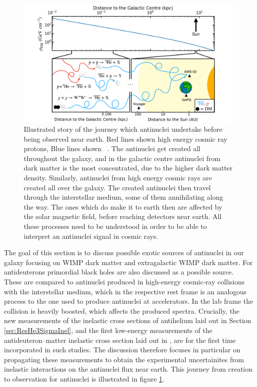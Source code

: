 \begin{figure}
    \centering
    \includegraphics[width=\textwidth]{figures/GalaxyStory.pdf}
    \caption{Illustrated story of the journey which antinuclei undertake before being observed near earth. Red lines shown high energy cosmic ray protons, Blue lines shown \ahe\ . The antinuclei get created all throughout the galaxy, and in the galactic centre antinuclei from dark matter is the most concentrated, due to the higher dark matter density. Similarly, antinuclei from high energy cosmic rays are created all over the galaxy. The created antinuclei then travel through the interstellar medium, some of them annihilating along the way. The ones which do make it to earth then are affected by the solar magnetic field, before reaching detectors near earth. All these processes need to be understood in order to be able to interpret an antinuclei signal in cosmic rays.}
    \label{fig:Galaxy_story}
\end{figure}
The goal of this section is to discuss possible exotic sources of antinuclei in our galaxy focusing on WIMP dark matter and extragalactic WIMP dark matter. For antideuterons primordial black holes are also discussed as a possible source. These are compared to antinuclei produced in high-energy cosmic-ray collisions with the interstellar medium, which in the respective rest frame is an analogous process to the one used to produce antinuclei at accelerators. In the lab frame the collision is heavily boosted, which affects the produced spectra. Crucially, the new measurements of the inelastic cross sections of antihelium laid out in Section \ref{sec:ResHe3SigmaInel}, and the first low-energy measurements of the antideuteron--matter inelastic cross section laid out in \cite{antideuteronXS}, are for the first time incorporated in such studies. The discussion therefore focuses in particular on propagating these measurements to obtain the experimental uncertainites from inelastic interactions on the antinuclei flux near earth. This journey from creation to observation for antinuclei is illustrated in figure \ref{fig:Galaxy_story}.\\


